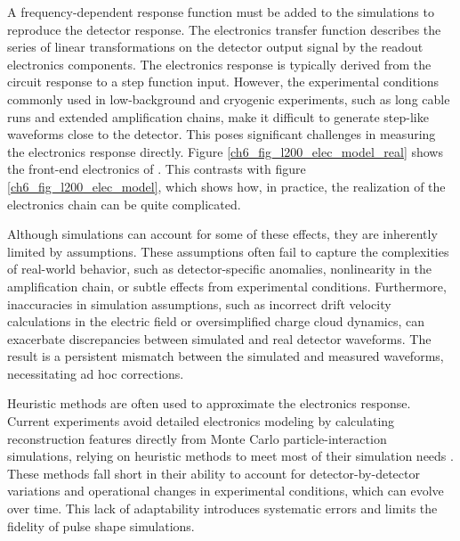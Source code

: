 A frequency-dependent response function must be added to the simulations to reproduce the detector response. The electronics transfer function describes the series of linear transformations on the detector output signal by the readout electronics components. The electronics response is typically derived from the circuit response to a step function input. However, the experimental conditions commonly used in low-background and cryogenic experiments, such as long cable runs and extended amplification chains, make it difficult to generate step-like waveforms close to the detector. This poses significant challenges in measuring the electronics response directly. Figure \ref{ch6_fig_l200_elec_model_real} shows the front-end electronics of {\Ltwo}. This contrasts with figure \ref{ch6_fig_l200_elec_model}, which shows how, in practice, the realization of the electronics chain can be quite complicated.

Although simulations can account for some of these effects, they are inherently limited by assumptions. These assumptions often fail to capture the complexities of real-world behavior, such as detector-specific anomalies, nonlinearity in the amplification chain, or subtle effects from experimental conditions. Furthermore, inaccuracies in simulation assumptions, such as incorrect drift velocity calculations in the electric field or oversimplified charge cloud dynamics, can exacerbate discrepancies between simulated and real detector waveforms. The result is a persistent mismatch between the simulated and measured waveforms, necessitating ad hoc corrections. 

Heuristic methods are often used to approximate the electronics response. Current experiments avoid detailed electronics modeling by calculating reconstruction features directly from Monte Carlo particle-interaction simulations, relying on heuristic methods to meet most of their simulation needs \cite{Ben_Thesis,Sam_Thesis}. These methods fall short in their ability to account for detector-by-detector variations and operational changes in experimental conditions, which can evolve over time. This lack of adaptability introduces systematic errors and limits the fidelity of pulse shape simulations.

